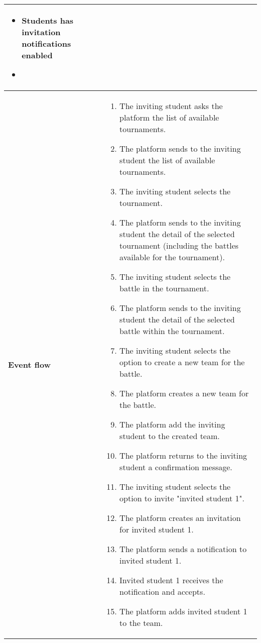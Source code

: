 \begin{enumerate}[label=\textbf{UC\arabic*}:,ref=UC\arabic*,leftmargin=1.3cm]
{\begin{table}[H]
\begin{tabular}{|l|p{11.9cm}|}
\begin{itemize}
                              \item Students has invitation notifications enabled
                              \item 
                        \end{itemize}                           \\\hline
                        \textbf{Event flow}      &
                        \begin{enumerate}[label=\arabic*.]
                              \item The inviting student asks the platform the list of available tournaments.
                              \item The platform sends to the inviting student the list of available tournaments.
                              \item The inviting student selects the tournament.
                              \item The platform sends to the inviting student the detail of the selected tournament (including the battles available for the tournament).
                              \item The inviting student selects the battle in the tournament.
                              \item The platform sends to the inviting student the detail of the selected battle within the tournament.
                              \item The inviting student selects the option to create a new team for the battle.
                              \item The platform creates a new team for the battle.
                              \item The platform add the inviting student to the created team.
                              \item The platform returns to the inviting student a confirmation message.
                              \item The inviting student selects the option to invite "invited student 1".
                              \item The platform creates an invitation for invited student 1.
                              \item The platform sends a notification to invited student 1.
                              \item Invited student 1 receives the notification and accepts.
                              \item The platform adds invited student 1 to the team.

\end{enumerate}
\end{tabular}
\end{table}}
\end{enumerate}
